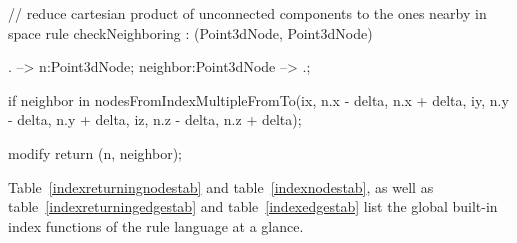 \begin{example}
\begin{grgen}
// reduce cartesian product of unconnected components to the ones nearby in space
rule checkNeighboring : (Point3dNode, Point3dNode) {
  . --> n:Point3dNode;
  neighbor:Point3dNode --> .;

  if {
    neighbor in nodesFromIndexMultipleFromTo(ix, n.x - delta, n.x + delta, iy, n.y - delta, n.y + delta, iz, n.z - delta, n.z + delta);
  }

  modify {
    return (n, neighbor);
  }
}
\end{grgen}

\end{example}


Table~\ref{indexreturningnodestab} and table~\ref{indexnodestab}, as well as table~\ref{indexreturningedgestab} and table~\ref{indexedgestab} list the global built-in index functions of the rule language at a glance.

